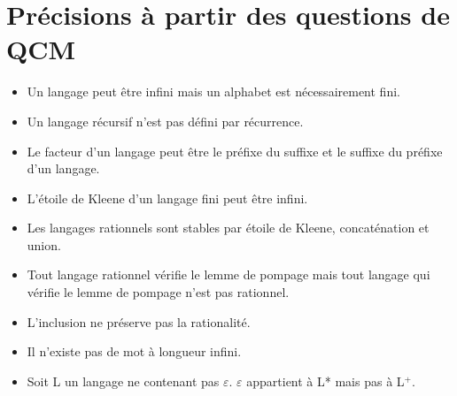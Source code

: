 \documentclass{article}
\begin{document}
\section{Précisions à partir des questions de QCM}
\begin{itemize}
    \item Un langage peut être infini mais un alphabet est nécessairement fini.
	\item Un langage récursif n'est pas défini par récurrence.
	\item Le facteur d'un langage peut être le préfixe du suffixe et le suffixe du préfixe d'un langage.
	\item L'étoile de Kleene d'un langage fini peut être infini.
	\item Les langages rationnels sont stables par étoile de Kleene, concaténation et union.
	\item Tout langage rationnel vérifie le lemme de pompage mais tout langage qui vérifie le lemme de pompage n'est pas rationnel.
	\item L'inclusion ne préserve pas la rationalité.
	\item Il n'existe pas de mot à longueur infini.
    \item Soit L un langage ne contenant pas $\varepsilon$. $\varepsilon$ appartient à L* mais pas à L$^{+}$.
\end{itemize}
\end{document}
